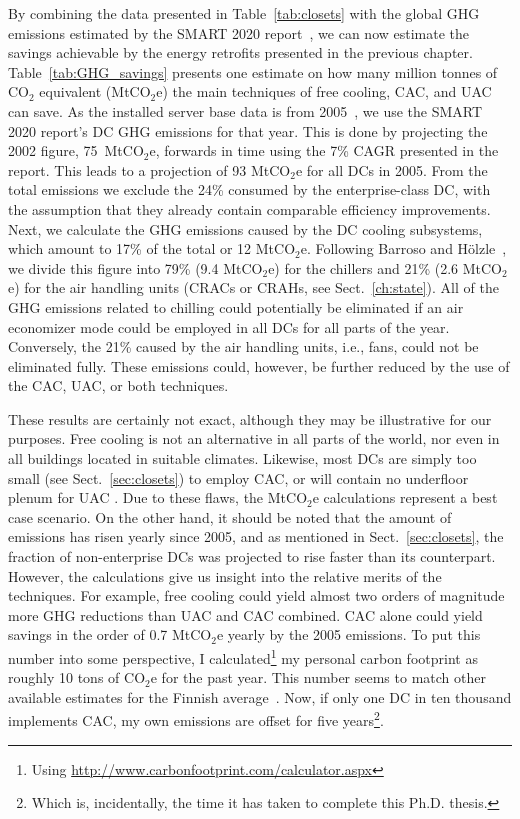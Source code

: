\documentclass[officiallayout]{tktla}
\begin{document}
By combining the data presented in Table~\ref{tab:closets} with the global GHG
emissions estimated by the SMART 2020 report~\cite{Webb2008}, we can now
estimate the savings achievable by the energy retrofits presented in the
previous chapter. Table~\ref{tab:GHG_savings} presents one estimate on how
many million tonnes of CO$_2$ equivalent (MtCO$_2$e) the main techniques of
free cooling, CAC, and UAC can save. As the installed server base data is from
2005~\cite{Bailey2006}, we use the SMART 2020 report's DC GHG emissions for
that year. This is done by projecting the 2002 figure, 75~MtCO$_2$e, forwards
in time using the 7\% CAGR presented in the report.  This leads to a
projection of 93 MtCO$_2$e for all DCs in 2005. From the total emissions we
exclude the 24\% consumed by the enterprise-class DC, with the assumption that
they already contain comparable efficiency improvements. Next, we calculate
the GHG emissions caused by the DC cooling subsystems, which amount to 17\% of
the total or 12 MtCO$_2$e. Following Barroso and Hölzle~\cite{Barroso2009}, we
divide this figure into 79\% (9.4 MtCO$_2$e) for the chillers and 21\% (2.6
MtCO$_2$e) for the air handling units (CRACs or CRAHs, see
Sect.~\ref{ch:state}). All of the GHG emissions related to chilling could
potentially be eliminated if an air economizer mode could be employed in all
DCs for all parts of the year. Conversely, the 21\% caused by the air handling
units, i.e., fans, could not be eliminated fully. These emissions could,
however, be further reduced by the use of the CAC, UAC, or both techniques.

These results are certainly not exact, although they may be illustrative for
our purposes. Free cooling is not an alternative in all parts of the world,
nor even in all buildings located in suitable climates. Likewise, most DCs are
simply too small (see Sect.~\ref{sec:closets}) to employ CAC, or will contain
no underfloor plenum for UAC . Due to these flaws, the MtCO$_2$e calculations
represent a best case scenario. On the other hand, it should be noted that the
amount of emissions has risen yearly since 2005, and as mentioned in
Sect.~\ref{sec:closets}, the fraction of non-enterprise DCs was projected to
rise faster than its counterpart. However, the calculations give us insight
into the relative merits of the techniques. For example, free cooling could
yield almost two orders of magnitude more GHG reductions than UAC and CAC
combined.  CAC alone could yield savings in the order of 0.7 MtCO$_2$e yearly
by the 2005 emissions.  To put this number into some perspective, I
calculated\footnote{Using
\url{http://www.carbonfootprint.com/calculator.aspx}} my personal carbon
footprint as roughly 10 tons of CO$_2$e for the past year.  This number seems
to match other available estimates for the Finnish
average~\cite{Hakkinen2012}.  Now, if only one DC in ten thousand implements
CAC, my own emissions are offset for five years\footnote{Which is,
incidentally, the time it has taken to complete this Ph.D. thesis.}. 
\end{document}
